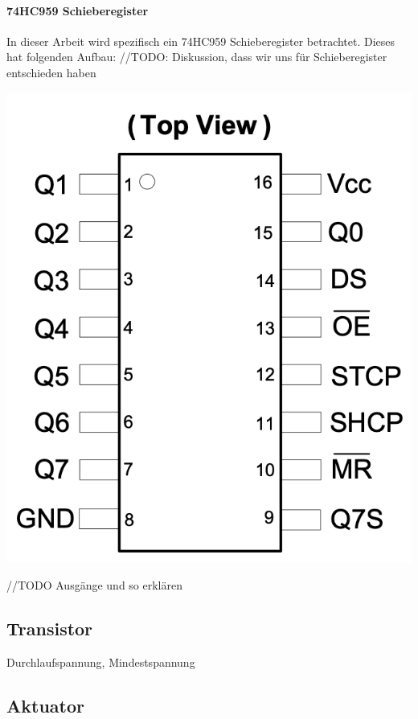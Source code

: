 \paragraph{74HC959 Schieberegister}
In dieser Arbeit wird spezifisch ein 74HC959 Schieberegister betrachtet. Dieses hat folgenden Aufbau:
//TODO: Diskussion, dass wir uns für Schieberegister entschieden haben \newline
\begin{minipage}{0.4\textwidth}
	\includegraphics [width=\textwidth] {img/Schieberegister}
\end{minipage}
\begin{minipage}{0.6\textwidth}
	//TODO Ausgänge und so erklären
\end{minipage}
\newline


\subsection{Transistor}
Durchlaufspannung, Mindestspannung
\subsection{Aktuator}\label{subsec:aktuator}

